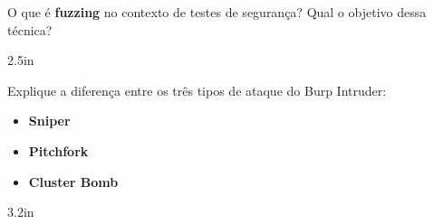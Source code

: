 \documentclass[12pt]{exam}
\begin{document}
\begin{questions}




\question O que é \textbf{fuzzing} no contexto de testes de segurança? Qual o objetivo dessa técnica?
\begin{solutionbox}{2.5in}
\end{solutionbox}

\question Explique a diferença entre os três tipos de ataque do Burp Intruder:
\begin{itemize}
\item \textbf{Sniper}
\item \textbf{Pitchfork}
\item \textbf{Cluster Bomb}
\end{itemize}
\begin{solutionbox}{3.2in}
\end{solutionbox}

%
%

\end{questions}
\end{document}
